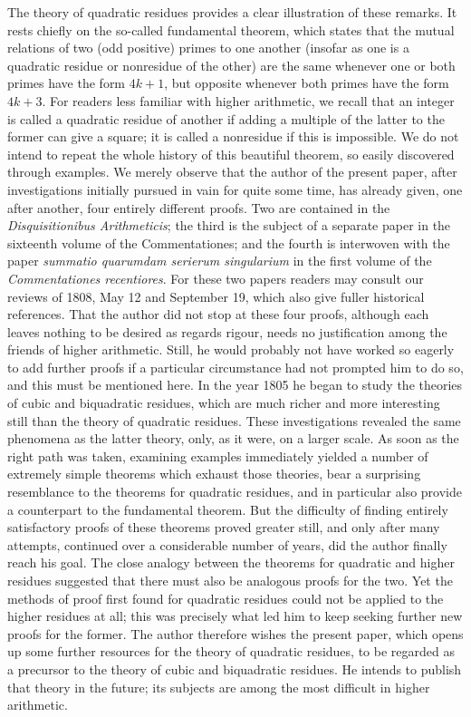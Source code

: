 The theory of quadratic residues provides a clear illustration of these remarks. It rests chiefly on the so-called fundamental theorem, which states that the mutual relations of two (odd positive) primes to one another (insofar as one is a quadratic residue or nonresidue of the other) are the same whenever one or both primes have the form $4k+1$, but opposite whenever both primes have the form $4k+3$. For readers less familiar with higher arithmetic, we recall that an integer is called a quadratic residue of another if adding a multiple of the latter to the former can give a square; it is called a nonresidue if this is impossible. We do not intend to repeat the whole history of this beautiful theorem, so easily discovered through examples. We merely observe that the author of the present paper, after investigations initially pursued in vain for quite some time, has already given, one after another, four entirely different proofs. Two are contained in the \emph{Disquisitionibus Arithmeticis}; the third is the subject of a separate paper in the sixteenth volume of the Commentationes; and the fourth is interwoven with the paper \emph{summatio quarumdam serierum singularium} in the first volume of the \emph{Commentationes recentiores}. For these two papers readers may consult our reviews of 1808, May 12 and September 19, which also give fuller historical references. That the author did not stop at these four proofs, although each leaves nothing to be desired as regards rigour, needs no justification among the friends of higher arithmetic. Still, he would probably not have worked so eagerly to add further proofs if
%
a particular circumstance had not prompted him to do so, and this must be mentioned here. In the year 1805 he began to study the theories of cubic and biquadratic residues, which are much richer and more interesting still than the theory of quadratic residues. These investigations revealed the same phenomena as the latter theory, only, as it were, on a larger scale. As soon as the right path was taken, examining examples immediately yielded a number of extremely simple theorems which exhaust those theories, bear a surprising resemblance to the theorems for quadratic residues, and in particular also provide a counterpart to the fundamental theorem. But the difficulty of finding entirely satisfactory proofs of these theorems proved greater still, and only after many attempts, continued over a considerable number of years, did the author finally reach his goal. The close analogy between the theorems for quadratic and higher residues suggested that there must also be analogous proofs for the two. Yet the methods of proof first found for quadratic residues could not be applied to the higher residues at all; this was precisely what led him to keep seeking further new proofs for the former. The author therefore wishes the present paper, which opens up some further resources for the theory of quadratic residues, to be regarded as a precursor to the theory of cubic and biquadratic residues. He intends to publish that theory in the future; its subjects are among the most difficult in higher arithmetic.

